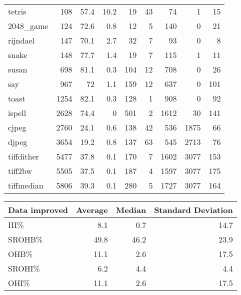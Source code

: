 \begin{tabular}{lrrrrrrrr}
 tetris          &      108 &     57.4 &   10.2 &   19 &   43 &     74 &     1 &    15 \\
 2048\_game       &      124 &     72.6 &    0.8 &   12 &    5 &    140 &     0 &    21 \\
 rijndael        &      147 &     70.1 &    2.7 &   32 &    7 &     93 &     0 &     8 \\
 snake           &      148 &     77.7 &    1.4 &   19 &    7 &    115 &     1 &    11 \\
 susan           &      698 &     81.1 &    0.3 &  104 &   12 &    708 &     0 &    26 \\
 say             &      967 &     72   &    1.1 &  159 &   12 &    637 &     0 &   101 \\
 toast           &     1254 &     82.1 &    0.3 &  128 &    1 &    908 &     0 &    92 \\
 ispell          &     2628 &     74.4 &    0   &  501 &    2 &   1612 &    30 &   141 \\
 cjpeg           &     2760 &     24.1 &    0.6 &  138 &   42 &    536 &  1875 &    66 \\
 djpeg           &     3654 &     19.2 &    0.8 &  137 &   63 &    545 &  2713 &    76 \\
 tiffdither      &     5477 &     37.8 &    0.1 &  170 &    7 &   1602 &  3077 &   153 \\
 tiff2bw         &     5505 &     37.5 &    0.1 &  187 &    4 &   1597 &  3077 &   175 \\
 tiffmedian      &     5806 &     39.3 &    0.1 &  280 &    5 &   1727 &  3077 &   164 \\
\hline
\end{tabular}\begin{tabular}{lrrr}
\hline
 Data improved   &   Average &   Median &   Standard Deviation \\
\hline
 III\%            &       8.1 &      0.7 &                 14.7 \\
 SROHB\%          &      49.8 &     46.2 &                 23.9 \\
 OHB\%            &      11.1 &      2.6 &                 17.5 \\
 SROHI\%          &       6.2 &      4.4 &                  4.4 \\
 OHI\%            &      11.1 &      2.6 &                 17.5 \\
\hline
\end{tabular}